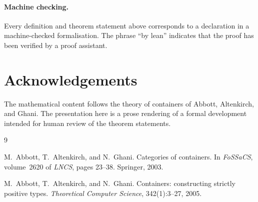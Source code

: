 \documentclass[11pt,a4paper]{article}
\theoremstyle{plain}
\theoremstyle{definition}
\begin{document}
\paragraph{Machine checking.}
Every definition and theorem statement above corresponds to a declaration in a
machine-checked formalisation. The phrase ``by lean'' indicates that the proof
has been verified by a proof assistant.

\section*{Acknowledgements}

The mathematical content follows the theory of containers of Abbott,
Altenkirch, and Ghani. The presentation here is a prose rendering of a formal
development intended for human review of the theorem statements.

\begin{thebibliography}{9}

M.~Abbott, T.~Altenkirch, and N.~Ghani.
\newblock Categories of containers.
\newblock In \emph{FoSSaCS}, volume~2620 of \emph{LNCS}, pages 23--38.
\newblock Springer, 2003.

M.~Abbott, T.~Altenkirch, and N.~Ghani.
\newblock Containers: constructing strictly positive types.
\newblock \emph{Theoretical Computer Science}, 342(1):3--27, 2005.

\end{thebibliography}
\end{document}

